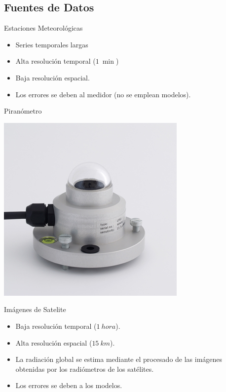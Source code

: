 \documentclass[xcolor={usenames,svgnames,dvipsnames}]{beamer}
\begin{document}
\subsection{Fuentes de Datos}
\label{sec:org7ac1588}
\begin{frame}[label={sec:orgfa6a70a}]{Estaciones Meteorológicas}
\begin{itemize}
\item Series temporales largas
\item Alta resolución temporal (\(\SI{1}{\min}\))
\item Baja resolución espacial.
\item Los errores se deben al medidor (no se emplean modelos).
\end{itemize}

\begin{block}{Piranómetro}
\begin{center}
\begin{center}
\includegraphics[height=0.5\textheight]{../figs/piranometro.jpg}
\end{center}
\end{center}
\end{block}
\end{frame}


\begin{frame}[label={sec:org5df10b3}]{Imágenes de Satelite}
\begin{itemize}
\item Baja resolución temporal (\(\SI{1}{hora}\)).

\item Alta resolución espacial (\(\SI{15}{km}\)).

\item La radiación global se estima mediante el procesado de las imágenes obtenidas por los radiómetros de los satélites.

\item Los errores se deben a los modelos.
\end{itemize}
\end{frame}
\end{document}
